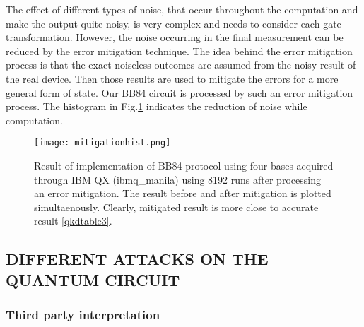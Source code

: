 \documentclass[superscriptaddress,twocolumn,showpacs,prb,floatfix]{revtex4}
\begin{document}
 The effect of different types of noise, that occur throughout the computation and make the output quite noisy, is very complex and needs to consider each gate transformation. However, the noise occurring in the final measurement can be reduced by the error mitigation technique. The idea behind the error mitigation process is that the exact noiseless outcomes are assumed from the noisy result of the real device. Then those results are used to mitigate the errors for a more general form of state. Our BB84 circuit is processed by such an error mitigation process\cite{GEM2020}. The histogram in Fig.\ref{mitigationhist} indicates the reduction of noise while computation.
\begin{figure}[H]
    \centering
    \texttt{[image: mitigationhist.png]}
    \caption{Result of implementation of BB84 protocol using four bases acquired through IBM QX (ibmq\_manila) using 8192 runs after processing an error mitigation. The result before and after mitigation is plotted simultaenously. Clearly, mitigated result is more close to accurate result \ref{qkdtable3}.}
    \label{mitigationhist}
 
\end{figure}
\subsection{DIFFERENT ATTACKS ON THE QUANTUM CIRCUIT}
\label{SecIIB}
\subsubsection{Third party interpretation}
\label{SecIIBi}
\end{document}
